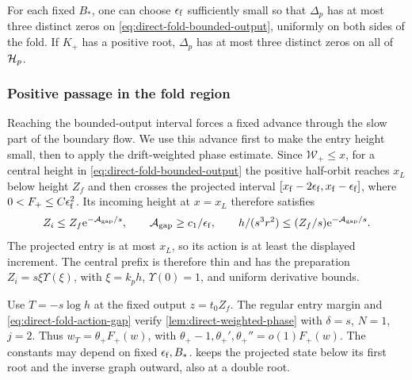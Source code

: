 \begin{proposition}
\label{prop:direct-fold-bounded}
For each fixed \(B_*\), one can choose \(\epsilon_{\rm f}\) sufficiently
small so that \(\Delta_p\) has at most three distinct zeros on
\eqref{eq:direct-fold-bounded-output}, uniformly on both sides of
the fold. If \(K_+\) has a positive root, \(\Delta_p\) has at most
three distinct zeros on all of \(\mathcal H_p\).
\end{proposition}

\subsubsection{Positive passage in the fold region}

Reaching the bounded-output interval forces a fixed advance through
the slow part of the boundary flow. We use this advance first to make
the entry height small, then to apply the drift-weighted phase estimate.
Since \(\mathcal W_+\le x\), for a central height in
\eqref{eq:direct-fold-bounded-output} the positive half-orbit
reaches \(x_L\) below height \(Z_f\) and then crosses the
projected interval \([x_{\rm f}-2\epsilon_{\rm f},x_{\rm f}-\epsilon_{\rm f}]\), where
\(0<F_+\le C\epsilon_{\rm f}^2\). Its incoming height at \(x=x_L\)
therefore satisfies
\begin{equation}
\label{eq:direct-fold-action-gap}
 Z_i\le Z_f\mathrm e^{-\mathcal A_{\rm gap}/s},\qquad
 \mathcal A_{\rm gap}\ge c_1/\epsilon_{\rm f},\qquad
 h/(s^3r^2)\le (Z_f/s)\mathrm e^{-\mathcal A_{\rm gap}/s}.
\end{equation}
The projected entry is at most \(x_L\), so its action is at least
the displayed increment. The central prefix is therefore thin and has the
preparation \(Z_i=s\xi \Upsilon(\xi)\), with
\(\xi=k_ph\), \(\Upsilon(0)=1\), and uniform derivative bounds.

Use \(T=-s\log h\) at the fixed output \(z=t_0Z_f\).
The regular entry margin and \eqref{eq:direct-fold-action-gap} verify
\cref{lem:direct-weighted-phase} with \(\delta=s\), \(N=1\), \(j=2\).
Thus \(w_T=\theta_+F_+(w)\), with
\(\theta_+-1,\theta_+',\theta_+''=o(1)F_+(w)\).
The constants may depend on fixed \(\epsilon_{\rm f},B_*\).
 keeps the projected state
below its first root and the inverse graph outward, also at a double root.

